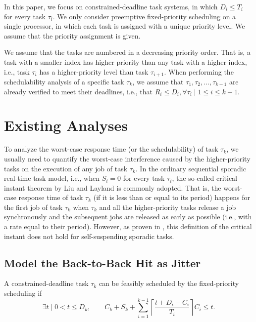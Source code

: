 \documentclass[10pt,conference]{IEEEtran}
\newcommand{\ceiling}[1]{\left\lceil{#1}\right\rceil}
\begin{document}
In this paper, we focus on constrained-deadline task systems, in which $D_i \leq T_i$ for every task $\tau_i$. We only consider preemptive fixed-priority scheduling on a single processor, in which each task is assigned with a unique priority level. We assume that the priority assignment is given.

We assume that the tasks are numbered in a decreasing priority order. That is, a task with a smaller index has higher priority than any task with a higher index, i.e., task $\tau_i$ has a higher-priority level than task $\tau_{i+1}$. When performing the schedulability analysis of a specific task $\tau_k$, we assume that $\tau_1, \tau_2, \ldots, \tau_{k-1}$ are already verified to meet their deadlines, i.e., that $R_i \leq D_i, \forall \tau_i \mid 1 \leq i \leq k-1$. 

\section{Existing Analyses}

To analyze the worst-case response time (or the schedulability) of task $\tau_k$, we usually need to quantify the worst-case interference caused by the higher-priority tasks on the execution of any job of task $\tau_k$. In the ordinary sequential sporadic real-time task model, i.e., when $S_i=0$ for every task $\tau_i$, the so-called critical instant theorem by Liu and Layland \cite{Liu_1973} is commonly adopted. That is, the worst-case response time of task $\tau_k$ (if it is less than or equal to its period) happens for the first job of task $\tau_k$ when $\tau_k$ and all the higher-priority tasks release a job synchronously and the subsequent jobs are released as early as possible (i.e., with a rate equal to their period).  However, as proven in \cite{ecrts15nelissen}, this definition of the
critical instant does not hold for self-suspending sporadic tasks.  

\subsection{Model the Back-to-Back Hit as Jitter}
\label{sec:jitter}


A constrained-deadline task $\tau_k$ can be feasibly scheduled by the fixed-priority scheduling if
\begin{equation}
\label{eq:TDA-jitter}
\exists t \mid 0 < t \leq D_k, \qquad C_k + S_k + \sum_{i=1}^{k-1}\ceiling{\frac{t+D_i-C_i}{T_i}} C_i \leq t.
\end{equation}
\end{document}
